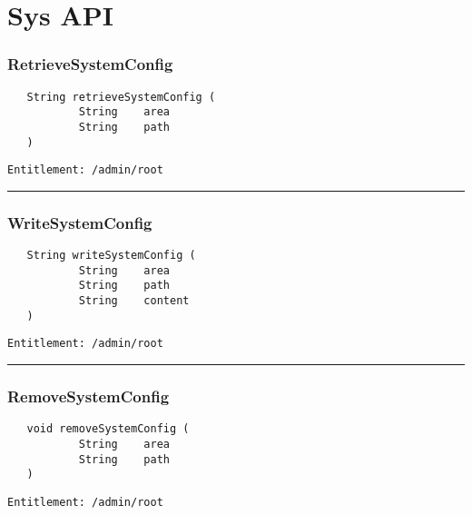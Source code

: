 \chapter{Sys API}

\subsection{RetrieveSystemConfig}
\label{Api:RetrieveSystemConfig}
\begin{Verbatim}
   String retrieveSystemConfig (
           String    area
           String    path
   )
\end{Verbatim}
\begin{Verbatim}[formatcom=\color{Maroon}]
  Entitlement: /admin/root
\end{Verbatim}



\rule{12cm}{2pt}
\subsection{WriteSystemConfig}
\label{Api:WriteSystemConfig}
\begin{Verbatim}
   String writeSystemConfig (
           String    area
           String    path
           String    content
   )
\end{Verbatim}
\begin{Verbatim}[formatcom=\color{Maroon}]
  Entitlement: /admin/root
\end{Verbatim}



\rule{12cm}{2pt}
\subsection{RemoveSystemConfig}
\label{Api:RemoveSystemConfig}
\begin{Verbatim}
   void removeSystemConfig (
           String    area
           String    path
   )
\end{Verbatim}
\begin{Verbatim}[formatcom=\color{Maroon}]
  Entitlement: /admin/root
\end{Verbatim}



